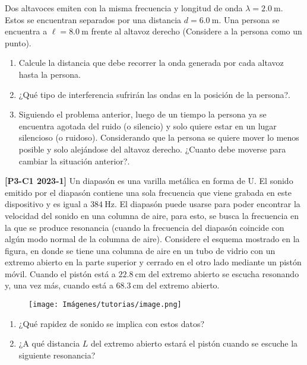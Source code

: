 \documentclass[letterpaper,11pt]{article}
\begin{document}
\vspace{-1cm}
\begin{enumerate}\setlength{\itemsep}{0.4cm}

\item[]



\item Dos altavoces emiten con la misma frecuencia  y longitud de onda $\lambda=\SI{2.0}{\m}$. Estos se encuentran separados por una distancia $d = \SI{6.0}{\m}$.
Una persona se encuentra a $\ell = \SI{8.0}{\m}$ frente al altavoz derecho (Considere a la persona como un punto).

\begin{enumerate}
    \item Calcule la distancia que debe recorrer la onda generada por cada altavoz hasta la persona.

    \item ¿Qué tipo de interferencia sufrirán las ondas en la posición de la persona?.

    \item Siguiendo el problema anterior, luego de un tiempo la persona ya se encuentra agotada del ruido (o silencio) y solo quiere estar en un lugar silencioso (o ruidoso).
Considerando que la persona se quiere mover lo menos posible y solo alejándose del altavoz derecho. ¿Cuanto debe moverse para cambiar la situación anterior?.
\end{enumerate}

\begin{minipage}{0.65\linewidth}
    \item \textbf{[P3-C1 2023-1]} Un diapasón es una varilla metálica en forma de U. El sonido emitido por el diapasón contiene una sola frecuencia que viene grabada en este dispositivo y es igual a $\SI{384}{\Hz}$. El diapasón puede usarse para poder encontrar la velocidad del sonido en una columna de aire, para esto, se busca la frecuencia en la que se produce resonancia (cuando la frecuencia del diapasón coincide con algún modo normal de la columna de aire). Considere el esquema mostrado en la figura, en donde se tiene una columna de aire en un tubo de vidrio con un extremo abierto en la parte superior y cerrado en el otro lado mediante un pistón móvil. Cuando el pistón está a $\SI{22.8}{\cm}$ del extremo abierto se escucha resonando y, una vez más, cuando está a $\SI{68.3}{\cm}$ del extremo abierto.
\end{minipage}
\hfill
\begin{minipage}{0.3\linewidth}
    \begin{figure}[H]
        \centering
        \texttt{[image: Imágenes/tutorias/image.png]}
    \end{figure}
\end{minipage}
\begin{enumerate}
    \item ¿Qué rapidez de sonido se implica con estos datos?
    \item ¿A qué distancia $L$ del extremo abierto estará el pistón cuando se escuche la siguiente resonancia?
\end{enumerate}



\end{enumerate}
\end{document}
